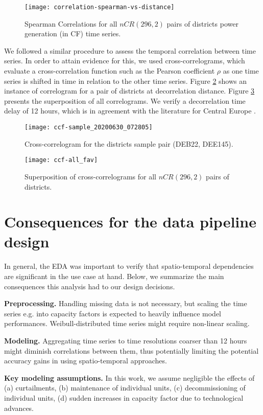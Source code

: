 \begin{figure}[H]%
	\centering
    \caption{Spearman Correlations for all $nCR(296, 2)$ pairs of districts power generation (in CF) time series.}
    \texttt{[image: correlation-spearman-vs-distance]}
	\label{fig:correlogram}
\end{figure}

We followed a similar procedure to assess the temporal correlation between time series.
In order to attain evidence for this, we used cross-correlograms, which evaluate a cross-correlation function such as the Pearson coefficient $\rho$ as one time series is shifted in time in relation to the other time series.
Figure \ref{fig:ccf} shows an instance of correlogram for a pair of districts at decorrelation distance.
Figure \ref{fig:ccf_all} presents the superposition of all correlograms.
We verify a decorrelation time delay of 12 hours, which is in agreement with the literature for Central Europe \cite{engeland2017variability}.

\begin{figure}[H]%
	\centering
    \caption{Cross-correlogram for the districts sample pair (DEB22, DEE145).}
    \texttt{[image: ccf-sample\_20200630\_072805]}
	\label{fig:ccf}
\end{figure}

\begin{figure}[H]%
	\centering
    \caption{Superposition of cross-correlograms for all $nCR(296, 2)$ pairs of districts.}
    \texttt{[image: ccf-all\_fav]}
	\label{fig:ccf_all}
\end{figure}


\section{Consequences for the data pipeline design}\label{sec:eda_conclusions}

In general, the EDA was important to verify that spatio-temporal dependencies are significant in the use case at hand.
Below, we summarize the main consequences this analysis had to our design decisions.

\vspace{1em}
\noindent
\textbf{Preprocessing.} Handling missing data is not necessary, but scaling the time series e.g. into capacity factors is expected to heavily influence model performances. Weibull-distributed time series might require non-linear scaling.

\vspace{1em}
\noindent
\textbf{Modeling.} Aggregating time series to time resolutions coarser than 12 hours might diminish correlations between them, thus potentially limiting the potential accuracy gains in using spatio-temporal approaches.

\vspace{1em}
\noindent
\textbf{Key modeling assumptions.} In this work, we assume negligible the effects of (a) curtailments, (b) maintenance of individual units, (c) decommissioning of individual units, (d) sudden increases in capacity factor due to technological advances.
